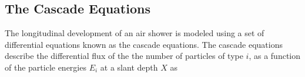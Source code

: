 












\subsection{The Cascade Equations}\label{ssec:cascade_equations}
The longitudinal development of an air shower is modeled using a set of differential equations known as the cascade equations.
The cascade equations describe the differential flux of the the number of particles of type $i$, as a function of the particle energies $E_{i}$ at a slant depth $X$ as

